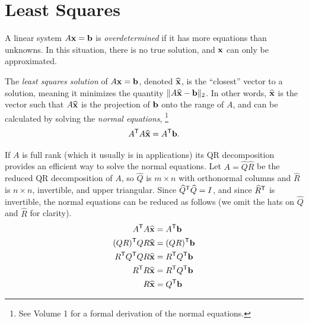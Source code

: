 \label{lab:qr-applications}

\section*{Least Squares} %

A linear system $A\mathbf{x} = \mathbf{b}$ is \emph{overdetermined} if it has more equations than unknowns.
In this situation, there is no true solution, and $\mathbf{x}$ can only be approximated.

The \emph{least squares solution} of $A\mathbf{x} = \mathbf{b}$, denoted $\widehat{\mathbf{x}}$, is the ``closest'' vector to a solution, meaning it minimizes the quantity $\|A\widehat{\mathbf{x}} - \mathbf{b}\|_2$.
In other words, $\widehat{\mathbf{x}}$ is the vector such that $A\widehat{\mathbf{x}}$ is the projection of $\mathbf{b}$ onto the range of $A$, and can be calculated by solving the \emph{normal equations},%
\footnote{See Volume 1 for a formal derivation of the normal equations.}
\[A^{\mathsf T} A\widehat{\mathbf{x}} = A^{\mathsf T} \mathbf{b}.\]

If $A$ is full rank (which it usually is in applications) its QR decomposition provides an efficient way to solve the normal equations.
Let $A = \widehat{Q}\widehat{R}$ be the reduced QR decomposition of $A$, so $\widehat{Q}$ is $m \times n$ with orthonormal columns and $\widehat{R}$ is $n \times n$, invertible, and upper triangular.
Since $\widehat{Q}^{\mathsf T} \widehat{Q} = I$, and since $\widehat{R}^{\mathsf T}$ is invertible, the normal equations can be reduced as follows (we omit the hats on $\widehat{Q}$ and $\widehat{R}$ for clarity).
\begin{align}
\nonumber
A^{\mathsf T} A\widehat{\mathbf{x}} &= A^{\mathsf T} \mathbf{b} \\ \nonumber
(Q R)^{\mathsf T} Q R  \widehat{\mathbf{x}}
&= (Q R)^{\mathsf T} \mathbf{b} \\ \nonumber
 R^{\mathsf T} Q^{\mathsf T} Q R  \widehat{\mathbf{x}}
&=  R^{\mathsf T} Q^{\mathsf T} \mathbf{b} \\ \nonumber
 R^{\mathsf T} R \widehat{\mathbf{x}}
&=  R^{\mathsf T} Q^{\mathsf T} \mathbf{b} \\
 R \widehat{\mathbf{x}}
&= Q^{\mathsf T} \mathbf{b} \label{eq:normal-equation-via-qr}
\end{align}

